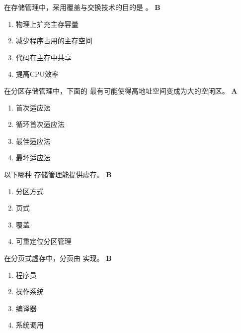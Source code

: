 \begin{problem}
	在存储管理中，采用覆盖与交换技术的目的是 \myline。
	\textbf{B}
	\vspace{-0.5em}
	\begin{multicols}{2}
		\begin{enumerate}[label=\Alph*.]
			\item 物理上扩充主存容量
			\item 减少程序占用的主存空间
			\item 代码在主存中共享
			\item 提高CPU效率
		\end{enumerate}
	\end{multicols}
	\vspace{-1em}
\end{problem}


\begin{problem}
	‍在分区存储管理中，下面的 \myline 最有可能使得高地址空间变成为大的空闲区。
	\textbf{A}
	\vspace{-0.5em}
	\begin{multicols}{4}
		\begin{enumerate}[label=\Alph*.]
			\item 首次适应法
			\item 循环首次适应法
			\item 最佳适应法
			\item 最坏适应法
		\end{enumerate}
	\end{multicols}
	\vspace{-1em}
\end{problem}


\begin{problem}
	以下哪种 \myline 存储管理能提供虚存。
	\textbf{B}
	\vspace{-0.5em}
	\begin{multicols}{4}
		\begin{enumerate}[label=\Alph*.]
			\item 分区方式
			\item 页式
			\item 覆盖
			\item 可重定位分区管理
		\end{enumerate}
	\end{multicols}
	\vspace{-1em}
\end{problem}


\begin{problem}
	在分页式虚存中，分页由 \myline 实现。
	\textbf{B}
	\vspace{-0.5em}
	\begin{multicols}{4}
		\begin{enumerate}[label=\Alph*.]
			\item 程序员
			\item 操作系统
			\item 编译器
			\item 系统调用
		\end{enumerate}
	\end{multicols}
	\vspace{-1em}
\end{problem}


